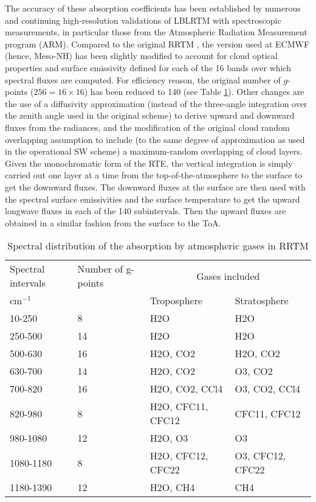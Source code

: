 The accuracy of these absorption coefficients has been established by numerous and continuing high-resolution validations of LBLRTM with spectroscopic measurements, in particular those from the Atmospheric Radiation Measurement program (ARM). Compared to the original RRTM \citep{Mlawer1997}, the version used at ECMWF (hence, Meso-NH) has been slightly modified to account for cloud optical properties and surface emissivity defined for each of the 16 bands over which spectral fluxes are computed. For efficiency reason, the original number of $g$-points ($256 = 16 \times 16$) has been reduced to 140 (see Table \ref{tabrrtm}). Other changes are the use of a diffusivity approximation (instead of the three-angle integration over the zenith angle used in the original scheme) to derive upward and downward fluxes from the radiances, and the modification of the original cloud random overlapping assumption to include (to the same degree of approximation as used in the operational SW scheme) a maximum-random overlapping of cloud layers. Given the monochromatic form of the RTE, the vertical integration is simply carried out one layer at a time from the top-of-the-atmosphere to the surface to get the downward fluxes. The downward fluxes at the surface are then used with the spectral surface emissivities and the surface temperature to get the upward longwave fluxes in each of the 140 subintervals. Then the upward fluxes are obtained in a similar fashion from the surface to the ToA.


\begin{table}[!ht]
\caption{Spectral distribution of the absorption by atmospheric gases in RRTM}
\begin{center}
\begin{tabular}{|l|l|l|l|}
\hline
Spectral intervals & Number of g-points & \multicolumn{2}{c|}{Gases included}\\
cm$^{-1}$ & & Troposphere & Stratosphere \\ 
\hline
10-250   &  8 & H2O & H2O \\ 
250-500  & 14 & H2O & H2O \\ 
500-630  & 16 & H2O, CO2 & H2O, CO2 \\ 
630-700  & 14 & H2O, CO2 & O3, CO2 \\ 
700-820  & 16 & H2O, CO2, CCl4 & O3, CO2, CCl4 \\ 
820-980  &  8 & H2O, CFC11, CFC12 & CFC11, CFC12 \\ 
980-1080 &  12 & H2O, O3 & O3 \\ 
1080-1180 &  8 & H2O, CFC12, CFC22 & O3, CFC12, CFC22 \\ 
1180-1390 & 12 & H2O, CH4 & CH4 \\
\hline
\end{tabular}
\label{tabrrtm}
\end{center}
\end{table}


